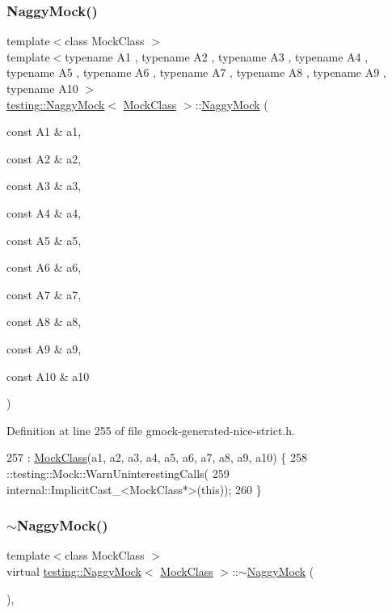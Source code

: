 \subsubsection{\texorpdfstring{Naggy\+Mock()}{NaggyMock()}\hspace{0.1cm}{\footnotesize\ttfamily [11/11]}}
{\footnotesize\ttfamily template$<$class Mock\+Class $>$ \\
template$<$typename A1 , typename A2 , typename A3 , typename A4 , typename A5 , typename A6 , typename A7 , typename A8 , typename A9 , typename A10 $>$ \\
\hyperlink{classtesting_1_1NaggyMock}{testing\+::\+Naggy\+Mock}$<$ \hyperlink{classMockClass}{Mock\+Class} $>$\+::\hyperlink{classtesting_1_1NaggyMock}{Naggy\+Mock} (\begin{DoxyParamCaption}\item[{const A1 \&}]{a1,  }\item[{const A2 \&}]{a2,  }\item[{const A3 \&}]{a3,  }\item[{const A4 \&}]{a4,  }\item[{const A5 \&}]{a5,  }\item[{const A6 \&}]{a6,  }\item[{const A7 \&}]{a7,  }\item[{const A8 \&}]{a8,  }\item[{const A9 \&}]{a9,  }\item[{const A10 \&}]{a10 }\end{DoxyParamCaption})\hspace{0.3cm}{\ttfamily [inline]}}



Definition at line 255 of file gmock-\/generated-\/nice-\/strict.\+h.


\begin{DoxyCode}
257                       : \hyperlink{classMockClass}{MockClass}(a1, a2, a3, a4, a5, a6, a7, a8, a9, a10) \{
258     ::testing::Mock::WarnUninterestingCalls(
259         internal::ImplicitCast\_<MockClass*>(\textcolor{keyword}{this}));
260   \}
\end{DoxyCode}
\mbox{\label{classtesting_1_1NaggyMock_a4d314aa583c985502eaec875440394ca}} 
\subsubsection{\texorpdfstring{$\sim$\+Naggy\+Mock()}{~NaggyMock()}}
{\footnotesize\ttfamily template$<$class Mock\+Class $>$ \\
virtual \hyperlink{classtesting_1_1NaggyMock}{testing\+::\+Naggy\+Mock}$<$ \hyperlink{classMockClass}{Mock\+Class} $>$\+::$\sim$\hyperlink{classtesting_1_1NaggyMock}{Naggy\+Mock} (\begin{DoxyParamCaption}{ }\end{DoxyParamCaption})\hspace{0.3cm}{\ttfamily [inline]}, {\ttfamily [virtual]}}




